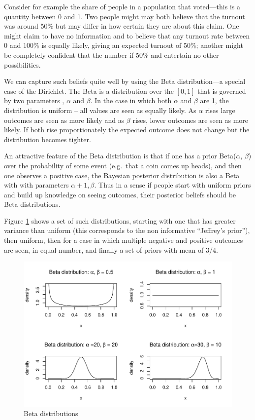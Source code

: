 \documentclass[12pt,]{book}
\begin{document}
Consider for example the share of people in a population that voted---this is a quantity between 0 and 1. Two people might may both believe that the turnout was around 50\% but may differ in how certain they are about this claim. One might claim to have no information and to believe that any turnout rate between 0 and 100\% is equally likely, giving an expected turnout of 50\%; another might be completely confident that the number if 50\% and entertain no other possibilities.

We can capture such beliefs quite well by using the Beta distribution---a special case of the Dirichlet. The Beta is a distribution over the \([0,1]\) that is governed by two parameters , \(\alpha\) and \(\beta\). In the case in which both \(\alpha\) and \(\beta\) are 1, the distribution is uniform -- all values are seen as equally likely. As \(\alpha\) rises large outcomes are seen as more likely and as \(\beta\) rises, lower outcomes are seen as more likely. If both rise proportionately the expected outcome does not change but the distribution becomes tighter.

An attractive feature of the Beta distribution is that if one has a prior Beta(\(\alpha\), \(\beta\)) over the probability of some event (e.g.~that a coin comes up heads), and then one observes a positive case, the Bayesian posterior distribution is also a Beta with with parameters \(\alpha+1, \beta\). Thus in a sense if people start with uniform priors and build up knowledge on seeing outcomes, their posterior beliefs should be Beta distributions.

Figure \ref{fig:Betas} shows a set of such distributions, starting with one that has greater variance than uniform (this corresponds to the non informative ``Jeffrey's prior''), then uniform, then for a case in which multiple negative and positive outcomes are seen, in equal number, and finally a set of priors with mean of 3/4.

\begin{figure}
\centering
\includegraphics{ii_files/figure-latex/Betas-1.pdf}
\caption{\label{fig:Betas}Beta distributions}
\end{figure}
\end{document}
